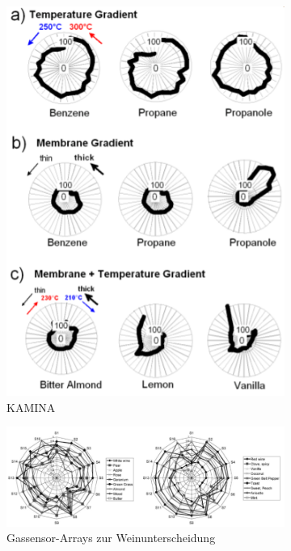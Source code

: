 \begin{figure}[h!]
	\begin{subfigure}{.3\textwidth}
		\includegraphics[width=\linewidth]{figures/ch04_kamina.png}
		\caption{KAMINA}
		\label{kamina}
	\end{subfigure}
	\begin{subfigure}{.6\textwidth}
		\includegraphics[width=\linewidth]{figures/ch04_wein.png}
		\caption{Gassensor-Arrays zur Weinunterscheidung}
		\label{wein}
	\end{subfigure}
	\caption{}
\end{figure}
